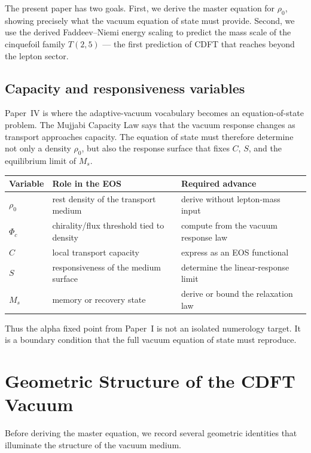 \documentclass[11pt]{article}
\begin{document}
The present paper has two goals.
First, we derive the master equation for $\rho_0$, showing precisely what the
vacuum equation of state must provide.
Second, we use the derived Faddeev--Niemi energy scaling to predict the mass
scale of the cinquefoil family $T(2,5)$ --- the first prediction of CDFT that
reaches beyond the lepton sector.

\subsection{Capacity and responsiveness variables}

Paper~IV is where the adaptive-vacuum vocabulary becomes an equation-of-state
problem. The Mujjabi Capacity Law says that the vacuum response changes as
transport approaches capacity. The equation of state must therefore determine
not only a density $\rho_0$, but also the response surface that fixes $C$, $S$,
and the equilibrium limit of $M_s$.

\begin{center}
\small
\begin{tabular}{p{}p{}p{}}
\toprule
\textbf{Variable} & \textbf{Role in the EOS} & \textbf{Required advance}\\
\midrule
$\rho_0$ & rest density of the transport medium & derive without lepton-mass input\\
$\Phi_c$ & chirality/flux threshold tied to density & compute from the vacuum response law\\
$C$ & local transport capacity & express as an EOS functional\\
$S$ & responsiveness of the medium surface & determine the linear-response limit\\
$M_s$ & memory or recovery state & derive or bound the relaxation law\\
\bottomrule
\end{tabular}
\end{center}

Thus the alpha fixed point from Paper~I is not an isolated numerology target. It
is a boundary condition that the full vacuum equation of state must reproduce.


\section{Geometric Structure of the CDFT Vacuum}
\label{sec:geometry}

Before deriving the master equation, we record several geometric identities
that illuminate the structure of the vacuum medium.
\end{document}
